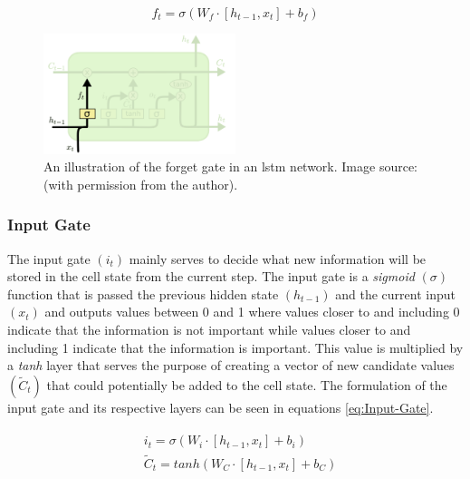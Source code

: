 \begin{equation}
    f_t = \sigma (W_f \cdot \left[h_{t-1}, x_t\right] + b_f)
\label{eq:LSTM-Forget-Gate}
\end{equation}

\begin{figure}[hbt!]
    \centering
    \includegraphics[width=0.5\textwidth]{Images/Chapter 3/LSTM/LSTM-Forget-Gate-Illustration.pdf}
    \caption{An illustration of the forget gate in an \gls{lstm} network. Image source: \cite{Colah}  (with permission from the author).}
    \label{fig:LSTM-Forget-Gate-Illustration}
\end{figure}

\subsubsection{Input Gate}
\label{subsubsec:Background-Information:Forecasting-Models:Long-Short-Term-Memory-Networks:Input-Gate}
The input gate $(i_t)$ mainly serves to decide what new information will be stored in the cell state from the current step. The input gate is a \textit{sigmoid} $(\sigma)$ function that is passed the previous hidden state $(h_{t-1})$ and the current input $(x_t)$ and outputs values between 0 and 1 where values closer to and including 0 indicate that the information is not important while values closer to and including 1 indicate that the information is important. This value is multiplied by a \textit{tanh} layer that serves the purpose of creating a vector of new candidate values $(\tilde{C}_t)$ that could potentially be added to the cell state. The formulation of the input gate and its respective layers can be seen in equations \ref{eq:Input-Gate}.

\begin{align}
    \begin{split}
        & i_t = \sigma (W_i \cdot \left[h_{t-1}, x_t \right] + b_i) \\
        & \tilde{C}_t = tanh (W_C \cdot \left[h_{t-1}, x_t \right] + b_C)
    \end{split}
\label{eq:Input-Gate}
\end{align}

